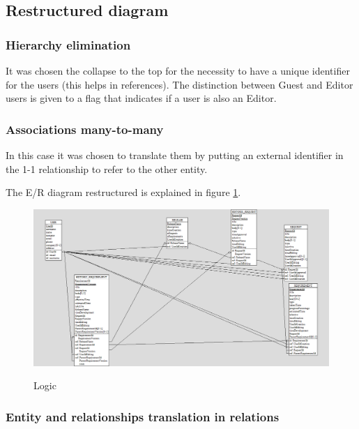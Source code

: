 \documentclass[12pt, a4paper]{report}
\begin{document}
\subsection*{Restructured diagram}

\subsubsection*{Hierarchy elimination}

It was chosen the collapse to the top for the necessity to have a unique identifier for the users (this helps in references).
The distinction between Guest and Editor users is given to a flag that indicates if a user is also an Editor.

\subsubsection*{Associations many-to-many}

In this case it was chosen to translate them by putting an external identifier in the 1-1 relationship to refer to the other
entity.

The E/R diagram restructured is explained in figure \ref{fig:ER_logic}.

\begin{figure}[H]
\centering
\caption{Logic}
\includegraphics[width=\textwidth]{E-R logic}
\label{fig:ER_logic}
\end{figure}

\subsubsection*{Entity and relationships translation in relations}
\end{document}
